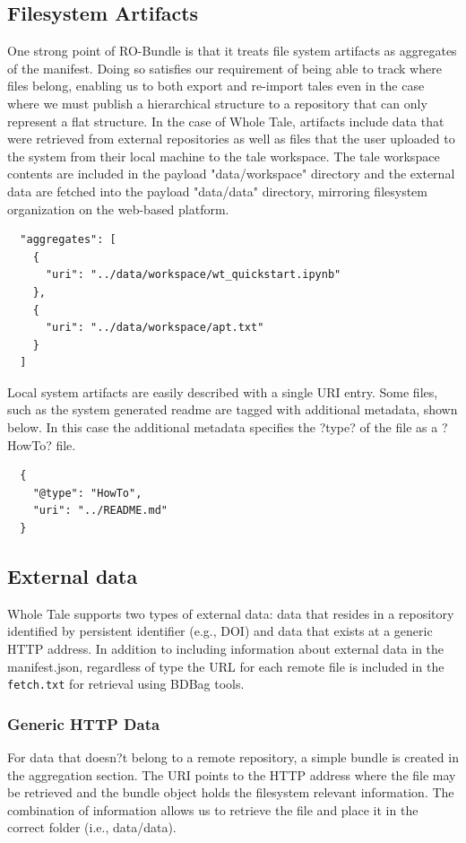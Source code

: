 \documentclass[conference]{IEEEtran}
\begin{document}
\subsection{Filesystem Artifacts}
One strong point of RO-Bundle is that it treats file system artifacts as aggregates of the 
manifest. Doing so satisfies our requirement of being able to track where files belong, enabling 
us to both export and re-import tales even in the case where we must publish a hierarchical 
structure to a repository that can only represent a flat structure. In the case of Whole Tale, 
artifacts include data that were 
retrieved from external repositories as well as files that the user uploaded to the system from 
their local machine to the tale workspace. The tale workspace contents are included in the payload 
"data/workspace" directory and the external data are fetched into the payload "data/data" 
directory, mirroring filesystem organization on the web-based platform.

\begin{lstlisting}
  "aggregates": [
    {
      "uri": "../data/workspace/wt_quickstart.ipynb"
    },
    {
      "uri": "../data/workspace/apt.txt"
    }
  ]
\end{lstlisting}

Local system artifacts are easily described with a single URI entry. Some files, such as the 
system generated readme are tagged with additional metadata, shown below. In this case the 
additional metadata specifies the ?type? of the file as a ?HowTo? file.

\begin{lstlisting}
  {
    "@type": "HowTo",
    "uri": "../README.md"
  }
\end{lstlisting}

\subsection{External data}

Whole Tale supports two types of external data: data that resides in a repository identified by 
persistent identifier (e.g., DOI) and data that exists at a generic HTTP address. In addition to 
including information about external data in the manifest.json, regardless of type the URL for 
each remote file is included in the \texttt{fetch.txt} for retrieval using BDBag tools.

\subsubsection{Generic HTTP Data}
For data that doesn?t belong to a remote repository, a simple bundle is created in the aggregation section. The URI points to the HTTP address where the file may be retrieved and the bundle object holds the filesystem relevant information. The combination of information allows us to retrieve the file and place it in the correct folder (i.e., data/data).
\end{document}
